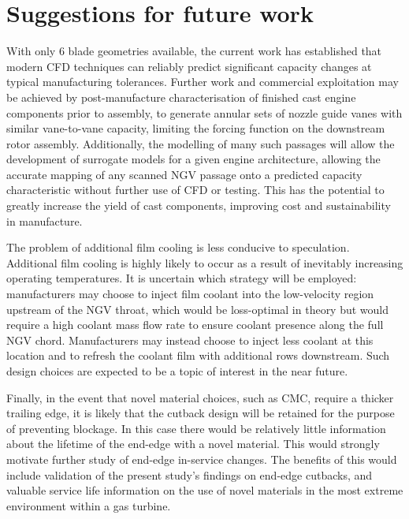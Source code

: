 \documentclass[a4paper, 11pt, oneside]{report}
\begin{document}
\section{Suggestions for future work}

With only 6 blade geometries available, the current work has established that modern CFD techniques can reliably predict significant capacity changes at typical manufacturing tolerances.  Further work and commercial exploitation may be achieved by post-manufacture characterisation of finished cast engine components prior to assembly, to generate annular sets of nozzle guide vanes with similar vane-to-vane capacity, limiting the forcing function on the downstream rotor assembly.  Additionally, the modelling of many such passages will allow the development of surrogate models for a given engine architecture, allowing the accurate mapping of any scanned NGV passage onto a predicted capacity characteristic without further use of CFD or testing. This has the potential to greatly increase the yield of cast components, improving cost and sustainability in manufacture.

The problem of additional film cooling is less conducive to speculation. Additional film cooling is highly likely to occur as a result of inevitably increasing operating temperatures. It is uncertain which strategy will be employed: manufacturers may choose to inject film coolant into the low-velocity region upstream of the NGV throat, which would be loss-optimal in theory but would require a high coolant mass flow rate to ensure coolant presence along the full NGV chord. Manufacturers may instead choose to inject less coolant at this location and to refresh the coolant film with additional rows downstream. Such design choices are expected to be a topic of interest in the near future.

Finally, in the event that novel material choices, such as CMC, require a thicker trailing edge, it is likely that the cutback design will be retained for the purpose of preventing blockage. In this case there would be relatively little information about the lifetime of the end-edge with a novel material. This would strongly motivate further study of end-edge in-service changes. The benefits of this would include validation of the present study's findings on end-edge cutbacks, and valuable service life information on the use of novel materials in the most extreme environment within a gas turbine.





\end{document}
